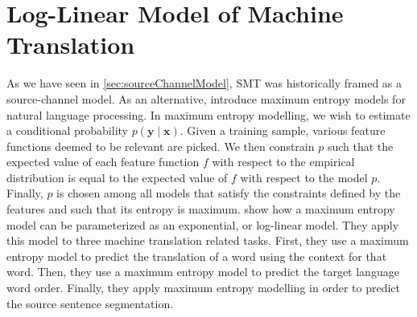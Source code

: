 %



\section{Log-Linear Model of Machine Translation}
\label{sec:loglinearModel}


As we have seen in \autoref{sec:sourceChannelModel}, SMT was historically
framed as a source-channel model. As an alternative,
\citet{berger-dellapietra-dellapietra:1996:CL} introduce maximum entropy
models for natural language processing. In maximum entropy modelling, we
wish to estimate a conditional probability $p(\bm{y} \mid \bm{x})$.
Given a training sample, various feature functions deemed to be relevant
are picked. We then constrain $p$ such that the expected value of each
feature function $f$ with respect to the empirical distribution is equal
to the expected value of $f$ with respect to the model $p$. Finally, $p$
is chosen among all models that satisfy the constraints defined by the
features and such that its entropy is maximum.
\citet{berger-dellapietra-dellapietra:1996:CL} show how a maximum entropy
model can be parameterized as an exponential, or log-linear model. They
apply this model to three machine translation related tasks. First, they
use a maximum entropy model to predict the translation of a word using
the context for that word. Then, they use a maximum entropy model to
predict the target language word order. Finally, they apply maximum
entropy modelling in order to predict the source sentence segmentation.

